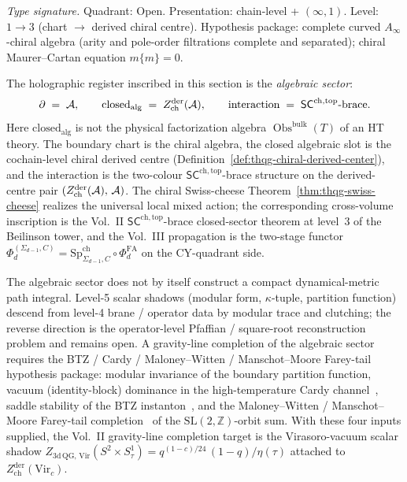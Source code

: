 \begin{remark}
\label{rem:thqg-oc-algebraic-sector}
\textit{Type signature.}
Quadrant: Open. Presentation: chain-level + $(\infty,1)$.
Level: $1 \to 3$ (chart $\to$ derived chiral centre).
Hypothesis package: complete curved $A_\infty$-chiral algebra
\textup{(}arity and pole-order filtrations complete and
separated\textup{)}; chiral Maurer--Cartan equation $m\{m\} = 0$.
\medskip

The holographic register inscribed in this section is the
\emph{algebraic sector}:
\begin{equation}\label{eq:thqg-oc-algebraic-sector}
\partial \;=\; \mathcal{A}, \qquad
\mathrm{closed}_{\mathrm{alg}} \;=\;
Z^{\mathrm{der}}_{\mathrm{ch}}(\mathcal{A}), \qquad
\mathrm{interaction} \;=\; \mathsf{SC}^{\mathrm{ch,top}}\text{-brace}.
\end{equation}
Here $\mathrm{closed}_{\mathrm{alg}}$ is not the physical
factorization algebra
$\operatorname{Obs}^{\mathrm{bulk}}(T)$ of an
HT theory.  The boundary chart is the chiral algebra, the closed
algebraic slot is the
cochain-level chiral derived centre
(Definition~\ref{def:thqg-chiral-derived-center}), and the interaction
is the two-colour
$\mathsf{SC}^{\mathrm{ch,top}}$-brace structure on the derived-centre
pair $(Z^{\mathrm{der}}_{\mathrm{ch}}(\mathcal{A}),\,\mathcal{A})$. The chiral
Swiss-cheese Theorem~\ref{thm:thqg-swiss-cheese} realizes the
universal local mixed action; the corresponding cross-volume
inscription is the Vol.~II
$\mathsf{SC}^{\mathrm{ch,top}}$-brace closed-sector theorem at level~$3$ of the
Beilinson tower, and the Vol.~III propagation is the two-stage
functor $\Phi_d^{(\Sigma_{d-1}, C)} = \mathrm{Sp}^{\mathrm{ch}}_{\Sigma_{d-1},C}
\circ \Phi_d^{\mathrm{FA}}$ on the CY-quadrant side.

The algebraic sector does not by itself construct a compact
dynamical-metric path integral. Level-5 scalar shadows (modular form,
$\kappa$-tuple, partition function) descend from level-4 brane /
operator data by modular trace and clutching; the reverse direction
is the operator-level Pfaffian / square-root reconstruction problem
and remains open. A gravity-line completion of the algebraic sector
requires the BTZ / Cardy / Maloney--Witten / Manschot--Moore Farey-tail
hypothesis package: modular invariance of the boundary partition
function, vacuum (identity-block) dominance in the high-temperature
Cardy channel~\cite{Cardy86}, saddle stability of the BTZ
instanton~\cite{BTZ92}, and the Maloney--Witten / Manschot--Moore
Farey-tail completion~\cite{Maloney-Witten07} of the
$\mathrm{SL}(2,\mathbb{Z})$-orbit sum. With these four inputs supplied,
the Vol.~II gravity-line completion target is the Virasoro-vacuum
scalar shadow $Z_{\mathrm{3d\,QG,\,Vir}}(S^2 \times S^1_\tau) =
q^{(1-c)/24}\,(1-q)/\eta(\tau)$ attached to
$Z^{\mathrm{der}}_{\mathrm{ch}}(\mathrm{Vir}_c)$.
\end{remark}

